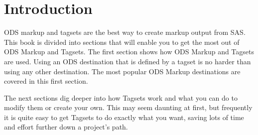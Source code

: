 \chapter{Introduction}
ODS markup and tagsets are the best way to create markup output
from SAS.  This book is divided into sections that will enable
you to get the most out of ODS Markup and Tagsets.  The first
section shows how ODS Markup and Tagsets are used.  Using an
ODS destination that is defined by a tagset is no harder than
using any other destination.  The most popular ODS Markup 
destinations are covered in this first section.

The next sections dig deeper into how Tagsets work and what
you can do to modify them or create your own.  This may
seem daunting at first, but frequently it is quite easy to
get Tagsets to do exactly what you want, saving lots of time
and effort further down a project's path.


